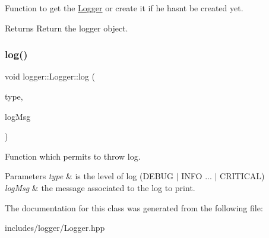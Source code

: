 Function to get the \hyperlink{classlogger_1_1_logger}{Logger} or create it if he hasn\textquotesingle{}t be created yet. 

\begin{DoxyReturn}{Returns}
Return the logger object. 
\end{DoxyReturn}
\mbox{\label{classlogger_1_1_logger_a3277b0828087906e53e8862f021a5822}} 
\subsubsection{\texorpdfstring{log()}{log()}}
{\footnotesize\ttfamily void logger\+::\+Logger\+::log (\begin{DoxyParamCaption}\item[{log\+\_\+type}]{type,  }\item[{std\+::string const \&}]{log\+Msg }\end{DoxyParamCaption})}



Function which permits to throw log. 


\begin{DoxyParams}{Parameters}
{\em type} & is the level of log (D\+E\+B\+UG $\vert$ I\+N\+FO ... $\vert$ C\+R\+I\+T\+I\+C\+AL) \\
\hline
{\em log\+Msg} & the message associated to the log to print. \\
\hline
\end{DoxyParams}


The documentation for this class was generated from the following file\+:\begin{DoxyCompactItemize}
\item 
includes/logger/Logger.\+hpp\end{DoxyCompactItemize}
